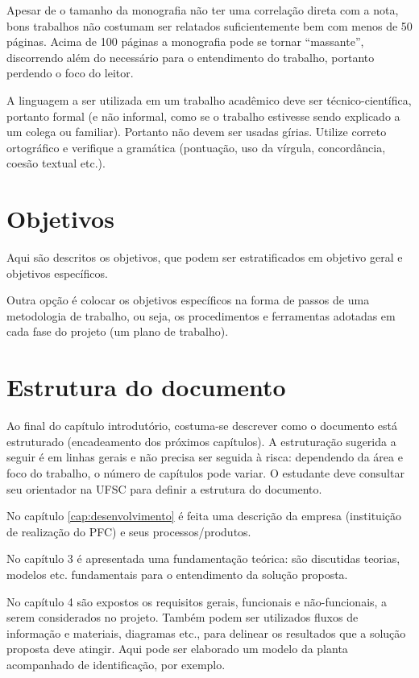 Apesar de o tamanho da monografia não ter uma correlação direta com a nota, bons trabalhos não costumam ser relatados suficientemente bem com menos de 50 páginas. Acima de 100 páginas a monografia pode se tornar ``massante'', discorrendo além do necessário para o entendimento do trabalho, portanto perdendo o foco do leitor.

A linguagem a ser utilizada em um trabalho acadêmico deve ser técnico-científica, portanto formal (e não informal, como se o trabalho estivesse sendo explicado a um colega ou familiar). Portanto não devem ser usadas gírias. Utilize correto ortográfico e verifique a gramática (pontuação, uso da vírgula, concordância, coesão textual etc.).

\section{Objetivos}

Aqui são descritos os objetivos, que podem ser estratificados em objetivo geral e objetivos específicos.

Outra opção é colocar os objetivos específicos na forma de passos de uma metodologia de trabalho, ou seja, os procedimentos e ferramentas adotadas em cada fase do projeto (um plano de trabalho).

\section*{Estrutura do documento}

Ao final do capítulo introdutório, costuma-se descrever como o documento está estruturado (encadeamento dos próximos capítulos). A estruturação sugerida a seguir é em linhas gerais e não precisa ser seguida à risca: dependendo da área e foco do trabalho, o número de capítulos pode variar. O estudante deve consultar seu orientador na UFSC para definir a estrutura do documento.

No capítulo \ref{cap:desenvolvimento} é feita uma descrição da empresa (instituição de realização do PFC) e seus processos/produtos.

No capítulo 3 é apresentada uma fundamentação teórica: são discutidas teorias, modelos etc. fundamentais para o entendimento da solução proposta.

No capítulo 4 são expostos os requisitos gerais, funcionais e não-funcionais, a serem considerados no projeto. Também podem ser utilizados fluxos de informação e materiais, diagramas etc., para delinear os resultados que a solução proposta deve atingir. Aqui pode ser elaborado um modelo da planta acompanhado de identificação, por exemplo.

